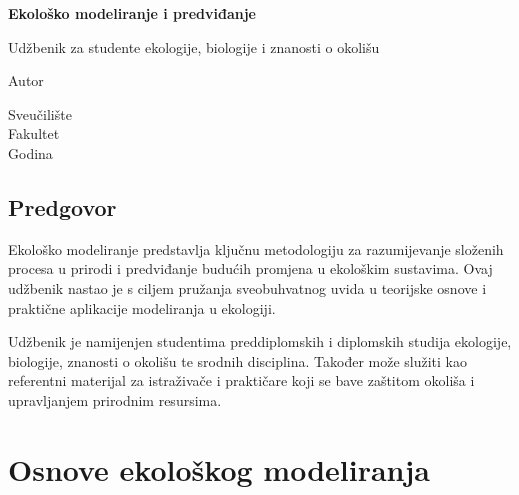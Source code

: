 \documentclass[12pt,a4paper,twoside]{book}
\begin{document}
	
	\begin{titlepage}
		\centering
		\vspace*{2cm}
		
		{\huge\bfseries Ekološko modeliranje i predviđanje}
		
		\vspace{1.5cm}
		
		{\Large Udžbenik za studente ekologije, biologije i znanosti o okolišu}
		
		\vspace{3cm}
		
		{\large Autor}
		
		\vspace{2cm}
		
		
		\vspace{2cm}
		
		{\large Sveučilište}\\
		{\large Fakultet}\\
		{\large Godina}
		
	\end{titlepage}
	
	\frontmatter
	\tableofcontents
	\listoffigures
	\listoftables
	
	\chapter*{Predgovor}
	
	Ekološko modeliranje predstavlja ključnu metodologiju za razumijevanje složenih procesa u prirodi i predviđanje budućih promjena u ekološkim sustavima. Ovaj udžbenik nastao je s ciljem pružanja sveobuhvatnog uvida u teorijske osnove i praktične aplikacije modeliranja u ekologiji.
	
	Udžbenik je namijenjen studentima preddiplomskih i diplomskih studija ekologije, biologije, znanosti o okolišu te srodnih disciplina. Također može služiti kao referentni materijal za istraživače i praktičare koji se bave zaštitom okoliša i upravljanjem prirodnim resursima.
	
	\mainmatter
	
	\part{Osnove ekološkog modeliranja}
	
\end{document}
